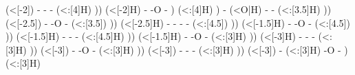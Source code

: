 \begin{struct}
{                                                            (<[-2])
                                                        -
                                                        -
                                                        -
                                                            (<:[4]H)
                                                    ))
                                                        (<[-2]H)
                                                    -
                                                    -O
                                                    -
                                                )
                                                    (<:[4]H)
                                                )
                                            -
                                                (<O|H)
                                            -
                                            -
                                                (<:[3.5]H)
                                        ))
                                            (<[-2.5])
                                        -
                                        -O
                                        -
                                            (<:[3.5])
                                    ))
                                        (<[-2.5]H)
                                    -
                                    -
                                    -
                                    -
                                        (<:[4.5])
                                ))
                                    (<[-1.5]H)
                                -
                                -O
                                -
                                    (<:[4.5])
                            ))
                                (<[-1.5]H)
                            -
                            -
                            -
                                (<:[4.5]H)
                        ))
                            (<[-1.5]H)
                        -
                        -O
                        -
                            (<:[3]H)
                    ))
                        (<[-3]H)
                    -
                    -
                    -
                        (<:[3]H)
                ))
                    (<[-3])
                -
                -O
                -
                    (<:[3]H)
            ))
                (<[-3])
            -
            -
            -
                (<:[3]H)
        ))
            (<[-3])
        -
            (<:[3]H)
        -O
        -
    )
        (<:[3]H)
}
\end{struct}
